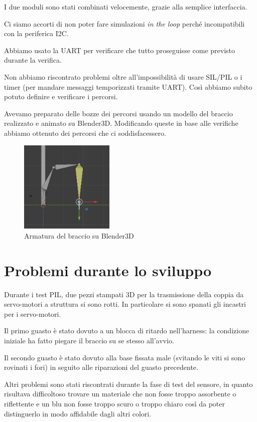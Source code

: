 \documentclass[12pt]{report}
\begin{document}
I due moduli sono stati combinati velocemente, grazie alla semplice interfaccia.

Ci siamo accorti di non poter fare simulazioni \emph{in the loop} perché incompatibili con la periferica I2C.

Abbiamo usato la UART per verificare che tutto proseguisse come previsto durante la verifica.

Non abbiamo riscontrato problemi oltre all'impossibilità di usare SIL/PIL o i timer (per mandare messaggi temporizzati tramite UART). Così abbiamo subito potuto definire e verificare i percorsi.

Avevamo preparato delle bozze dei percorsi usando un modello del braccio realizzato e animato su Blender3D. Modificando queste in base alle verifiche abbiamo ottenuto dei percorsi che ci soddisfacessero.

\begin{figure}
\centering
\includegraphics[width=0.4\textwidth]{Blender3D}
\caption{Armatura del braccio su Blender3D}
\end{figure}

\chapter{Problemi durante lo sviluppo}

Durante i test PIL, due pezzi stampati 3D per la trasmissione della coppia da servo-motori a struttura si sono rotti. In particolare si sono spanati gli incastri per i servo-motori.

Il primo guasto è stato dovuto a un blocca di ritardo nell'harness: la condizione iniziale ha fatto piegare il braccio su se stesso all'avvio.

Il secondo guasto è stato dovuto alla base fissata male (svitando le viti si sono rovinati i fori) in seguito alle riparazioni del guasto precedente.

Altri problemi sono stati riscontrati durante la fase di test del sensore, in quanto risultava difficoltoso trovare un materiale che non fosse troppo assorbente o riflettente e un blu non fosse troppo scuro o troppo chiaro così da poter distinguerlo in modo affidabile dagli altri colori.
\end{document}
